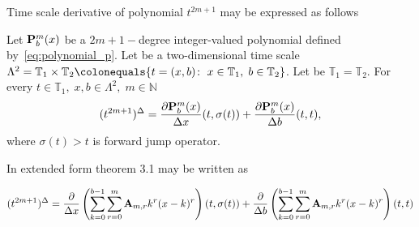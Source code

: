 Time scale derivative of polynomial $t^{2m+1}$ may be expressed as follows
\begin{thm}
    \label{main_theorem}
    Let ${\mathbf{P}}\sp{m} \sb{b}(x)$ be a $2m+1-$degree integer-valued polynomial defined by~\eqref{eq:polynomial_p}.
    Let be a two-dimensional time scale
    $\Lambda^2 = \mathbb{T}_1 \times \mathbb{T}_2 \colonequals \{t=(x, b) \colon \; x\in\mathbb{T}_1, \; b\in\mathbb{T}_2 \}$.
    Let be $\mathbb{T}_1 = \mathbb{T}_2$.
    For every $t\in\mathbb{T}_1, \; x,b\in \Lambda^2, \; m\in\mathbb{N}$
    \[
        (t^{2m+1})^{\Delta} =
        \frac{\partial {\mathbf{P}}\sp{m} \sb{b}(x)}{\Delta x}(t, \sigma(t)) +
        \frac{\partial {\mathbf{P}}\sp{m} \sb{b}(x)}{\Delta b}(t, t),
    \]
    where $\sigma(t) > t$ is forward jump operator.
\end{thm}

In extended form theorem 3.1 may be written as

\begin{align*}
    (t^{2m+1})^{\Delta} = \frac{\partial}{\Delta x} \left( \sum_{k=0}^{b-1} \sum_{r=0}^{m} {\mathbf{A}} \sb{m,r} k^r(x-k)^r \right) (t, \sigma(t))
    + \frac{\partial}{\Delta b} \left( \sum_{k=0}^{b-1} \sum_{r=0}^{m} {\mathbf{A}} \sb{m,r} k^r(x-k)^r \right) (t, t)
\end{align*}